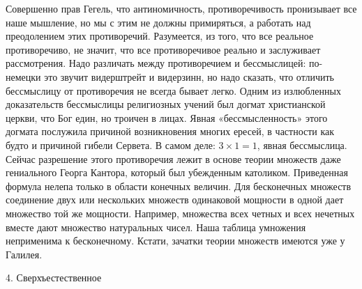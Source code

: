 Совершенно   прав   Гегель,   что   антиномичность,   противоречивость
пронизывает все наше  мышление, но мы с этим не  должны примиряться, а
работать над преодолением этих  противоречий. Разумеется, из того, что
все реальное противоречиво, не  значит, что все противоречивое реально
и  заслуживает  рассмотрения.  Надо различать  между  противоречием  и
бессмыслицей: по-немецки  это звучит видерштрейт и  видерзинн, но надо
сказать,  что отличить  бессмыслицу от  противоречия не  всегда бывает
легко.  Одним  из  излюбленных доказательств  бессмыслицы  религиозных
учений  был  догмат христианской  церкви,  что  Бог един,  но  троичен
в  лицах. Явная  «бессмысленность»  этого  догмата послужила  причиной
возникновения многих ересей,  в частности как будто  и причиной гибели
Сервета.  В  самом  деле:  $3   \times  1  =  1$,  явная  бессмыслица.
Сейчас разрешение  этого противоречия  лежит в основе  теории множеств
даже  гениального Георга  Кантора, который  был убежденным  католиком.
Приведенная  формула   нелепа  только  в  области   конечных  величин.
Для  бесконечных  множеств  соединение двух  или  нескольких  множеств
одинаковой мощности в одной дает  множество той же мощности. Например,
множества  всех   четных  и   всех  нечетных  вместе   дают  множество
натуральных чисел. Наша таблица  умножения неприменима к бесконечному.
Кстати, зачатки теории множеств имеются уже у Галилея.

4. Сверхъестественное

